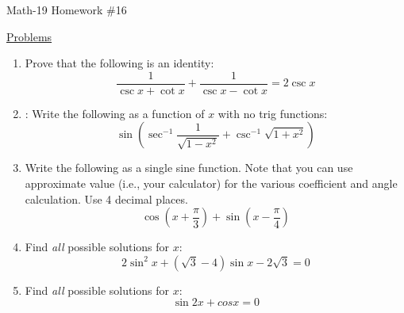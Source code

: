 \documentclass[letterpaper,12pt,fleqn]{article}
\begin{document}
\begin{center}
\Large Math-19 Homework \#16
\end{center}

\vspace{0.5in}

\underline{Problems}

\begin{enumerate}
\item Prove that the following is an identity:
  \[\frac{1}{\csc{x}+\cot{x}}+\frac{1}{\csc{x}-\cot{x}}=2\csc{x}\]

\item: Write the following as a function of $x$ with no trig functions:
  \[\sin\left(\sec^{-1}\frac{1}{\sqrt{1-x^2}}+\csc^{-1}\sqrt{1+x^2}\right)\]

\item Write the following as a single sine function. Note that you can use
  approximate value (i.e., your calculator) for the various coefficient and
  angle calculation. Use 4 decimal places.
  \[\cos\left(x+\frac{\pi}{3}\right)+\sin\left(x-\frac{\pi}{4}\right)\]

\item Find \emph{all} possible solutions for $x$:
  \[2\sin^2x+(\sqrt{3}-4)\sin{x}-2\sqrt{3}=0\]

\item Find \emph{all} possible solutions for $x$:
  \[\sin{2x}+cos{x}=0\]
\end{enumerate}
 
\end{document}
